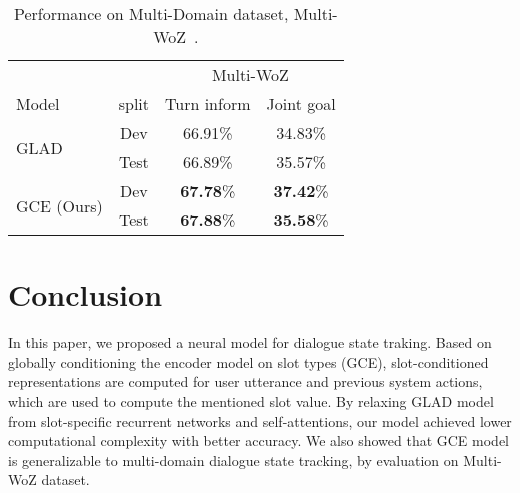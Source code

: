 \documentclass{article}
\begin{document}
\begin{table}[t!]
\caption{Performance on Multi-Domain dataset, Multi-WoZ~\citep{Budzianowski2018MultiWOZA}. 
}
\label{tab:mwoz}
\centering
\begin{tabular}{lccc}
\toprule
& &  \multicolumn{2}{c}{Multi-WoZ} \\
Model & split & Turn inform & Joint goal \\
\toprule
\multirow{2}{*}{\small GLAD~\citep{Zhong2018GlobalLocallySD}} & Dev & 66.91\% & 34.83\% \\
& \small Test & 66.89\% & 35.57\% \\
\midrule
\multirow{2}{*}{\small GCE (Ours)} &  Dev & \textbf{67.78}\% & \textbf{37.42}\% \\
& \small Test & \textbf{67.88}\% & \textbf{35.58}\% \\
\bottomrule
\end{tabular}
\end{table}






\section{Conclusion}
In this paper, we proposed a neural model for dialogue state traking. Based on globally conditioning the encoder model on slot types (GCE), slot-conditioned representations are computed for user utterance and previous system actions, which are used to compute the mentioned slot value. By relaxing GLAD model from slot-specific recurrent networks and self-attentions, our model achieved lower computational complexity with better accuracy. We also showed that GCE model is generalizable to multi-domain dialogue state tracking, by evaluation on Multi-WoZ dataset. 



\end{document}
